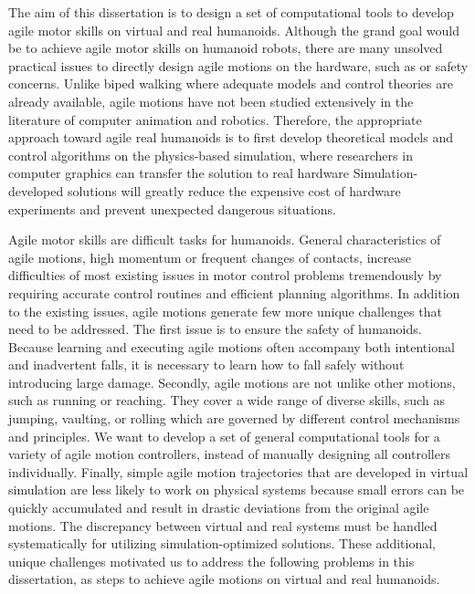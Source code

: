 The aim of this dissertation is to design a set of computational tools to
develop agile motor skills on virtual and real humanoids.
Although the grand goal would be to achieve agile motor skills on humanoid
robots, there are many unsolved practical issues to directly
design agile motions on the hardware,
such as  or safety concerns.
Unlike biped walking where adequate models and control theories are
already available, agile motions have not been studied extensively in the
literature of computer animation and robotics.
Therefore, the appropriate approach toward agile real humanoids is to first
develop theoretical models and control algorithms on the physics-based
simulation, where researchers in computer graphics can
 transfer the solution to real hardware
Simulation-developed solutions will
greatly reduce the expensive cost of hardware experiments and prevent
unexpected dangerous situations.

Agile motor skills are difficult tasks for humanoids.
General characteristics of agile motions, high momentum or frequent changes
of contacts, increase difficulties of most existing issues in motor control
problems tremendously
by requiring accurate control routines and efficient planning algorithms.
In addition to the existing issues, agile motions generate few more unique
challenges that need to be addressed. 
The first issue is to ensure the safety of humanoids.
Because learning and executing agile motions often accompany both intentional
and inadvertent falls, it is necessary to learn how to fall safely without
introducing large damage.
Secondly, agile motions are not  unlike other motions,
such as running or reaching.
They cover a wide range of diverse skills, such as jumping, vaulting, or
rolling which are governed by different control mechanisms and principles.
We want to develop a set of general computational tools for 
a variety of agile motion controllers, instead of manually designing all
controllers individually.  
Finally, simple agile motion trajectories that are developed in virtual
simulation are less likely to work on physical systems
because small errors can be quickly accumulated and result in drastic deviations
from the original agile motions.
The discrepancy between virtual and real systems must be handled
systematically for utilizing simulation-optimized solutions.
These additional, unique challenges motivated us to address the following 
problems in this dissertation, as steps to achieve agile motions 
on virtual and real humanoids.

